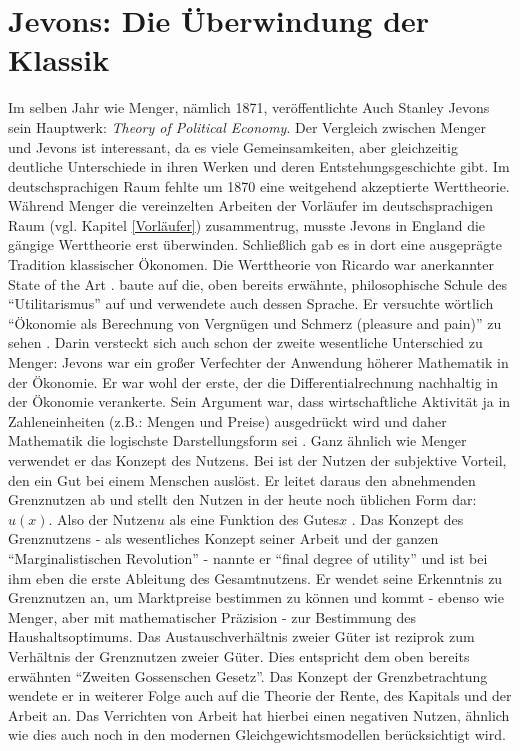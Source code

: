 \section{Jevons: Die Überwindung der Klassik}
\label{Jevons}

Im selben Jahr wie Menger, nämlich 1871, veröffentlichte Auch Stanley Jevons sein Hauptwerk: \textit{Theory of Political Economy}. Der Vergleich zwischen Menger und Jevons ist interessant, da es viele Gemeinsamkeiten, aber gleichzeitig deutliche Unterschiede in ihren Werken und deren Entstehungsgeschichte gibt. Im deutschsprachigen Raum fehlte um 1870 eine weitgehend akzeptierte Werttheorie. Während Menger die vereinzelten Arbeiten der Vorläufer im deutschsprachigen Raum (vgl. Kapitel \ref{Vorläufer}) zusammentrug, musste Jevons in England die gängige Werttheorie erst überwinden. Schließlich gab es in dort eine ausgeprägte Tradition klassischer Ökonomen. Die Werttheorie von Ricardo war anerkannter State of the Art \parencite[S. 320]{Rosner2012}. \textcite{Jevons1871} baute auf die, oben bereits erwähnte, philosophische Schule des "`Utilitarismus"' auf und verwendete auch dessen Sprache. Er versuchte wörtlich "`Ökonomie als Berechnung von Vergnügen und Schmerz (pleasure and pain)"' zu sehen \parencite[S. 321]{Rosner2012}. Darin versteckt sich auch schon der zweite wesentliche Unterschied zu Menger: Jevons war ein großer Verfechter der Anwendung höherer Mathematik in der Ökonomie. Er war wohl der erste, der die Differentialrechnung nachhaltig in der Ökonomie verankerte. Sein Argument war, dass wirtschaftliche Aktivität ja in Zahleneinheiten (z.B.: Mengen und Preise) ausgedrückt wird und daher Mathematik die logischste Darstellungsform sei \parencite[S. 71]{Jevons1871}. Ganz ähnlich wie Menger verwendet er das Konzept des Nutzens. Bei \textcite[S. 106]{Jevons1871} ist der Nutzen der subjektive Vorteil, den ein Gut bei einem Menschen auslöst. Er leitet daraus den abnehmenden Grenznutzen ab und stellt den Nutzen in der heute noch üblichen Form dar: $u(x)$. Also der Nutzen$u$ als eine Funktion des Gutes$x$ \parencite{Rosner2012}. Das Konzept des Grenznutzens - als wesentliches Konzept seiner Arbeit und der ganzen "`Marginalistischen Revolution"' - nannte er "`final degree of utility"' und ist bei ihm eben die erste Ableitung des Gesamtnutzens. Er wendet seine Erkenntnis zu Grenznutzen an, um Marktpreise bestimmen zu können und kommt - ebenso wie Menger, aber mit mathematischer Präzision - zur Bestimmung des Haushaltsoptimums. Das Austauschverhältnis zweier Güter ist reziprok zum Verhältnis der Grenznutzen zweier Güter. Dies entspricht dem oben bereits erwähnten "`Zweiten Gossenschen Gesetz"'. Das Konzept der Grenzbetrachtung wendete er in weiterer Folge auch auf die Theorie der Rente, des Kapitals und der Arbeit an. Das Verrichten von Arbeit hat hierbei einen negativen Nutzen, ähnlich wie dies auch noch in den modernen Gleichgewichtsmodellen berücksichtigt wird.

